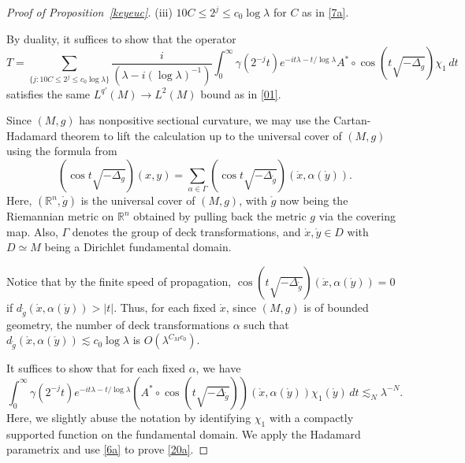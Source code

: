 \documentclass[11pt]{amsart}
\newcommand{\la}{\lambda}
\begin{document}
\begin{proof}[Proof of Proposition~\ref{keyeuc}]
\noindent(iii) $10C \le 2^j\le c_0\log\la$ for $C$ as in \eqref{7a}.


By duality, it suffices to show that
 the operator
\begin{equation}\label{20}
  T= \sum_{\{j: 10C\le 2^j\le c_0\log\la\}}\frac i{(\la-i(\log\la)^{-1})}\int_0^\infty \gamma(2^{-j}t)e^{-it\la-t/\log\la}   A^*\circ \cos (t\sqrt{-\Delta_g})\chi_1\,dt
\end{equation}
satisfies the same $L^{q'}(M)\to L^2(M)$ bound as in  \eqref{01}.


Since $(M,g)$ has nonpositive sectional curvature, we may use the 
Cartan-Hadamard theorem to lift the calculation up to the universal
cover of $(M,g)$ using the formula
from \cite[(3.6.4)]{SoggeHangzhou}
\begin{equation}\label{k.3}
    (\cos t\sqrt{-\Delta_{g}})(x,y)
=\sum_{\alpha\in \Gamma}
(\cos t\sqrt{-\Delta_{\mathring g}})(\mathring x,\alpha(\mathring y)).
\end{equation}
Here, $(\mathbb{R}^n,\mathring g)$ is the universal cover of 
$(M,g)$, with $\mathring g$ now being the Riemannian metric
on $\mathbb{R}^n$ obtained by pulling back the metric $g$
via the covering map.   Also, $\Gamma$ denotes the group of deck transformations, and $\mathring x, \mathring y \in D$ with $D\simeq M$ being a Dirichlet fundamental domain. 


Notice that by the finite speed of propagation,  $\cos (t\sqrt{-\Delta_{\mathring g}})(\mathring x,\alpha(\mathring y))=0$ if $d_{\mathring g}(\mathring x,\alpha(\mathring y))>|t|$.
Thus, for each fixed $\mathring x$, since $(M,g)$ is of bounded geometry,  the number of deck transformations $\alpha$ such that $d_{\mathring g}(\mathring x,\alpha(\mathring y))\lesssim c_0\log\la$ is $O(\la^{C_Mc_0})$. 


It suffices to show that for each fixed $\alpha$, we have
\begin{equation}\label{20a}
\int_0^\infty \gamma(2^{-j}t)e^{-it\la-t/\log\la}   (A^*\circ \cos (t\sqrt{-\Delta_{\mathring g}}))(\mathring x,\alpha(\mathring y))\chi_1(\mathring y)\,dt \lesssim_N \la^{-N}.
\end{equation}
Here, we slightly abuse the notation by identifying $\chi_1$ with a compactly supported function on the fundamental domain. We apply the Hadamard parametrix and use \eqref{6a} to prove \eqref{20a}. 


\end{proof}
\end{document}
